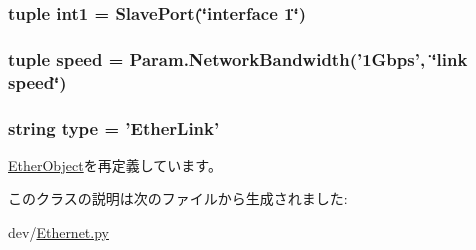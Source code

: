 \label{classEthernet_1_1EtherLink_a104730226138d5db620428dfce066f24}
\hypertarget{classEthernet_1_1EtherLink_ad5ae494ae031467268ae9a0b4260bf12}{
\subsubsection[{int1}]{\setlength{\rightskip}{0pt plus 5cm}tuple {\bf int1} = {\bf SlavePort}(\char`\"{}interface 1\char`\"{})}}
\label{classEthernet_1_1EtherLink_ad5ae494ae031467268ae9a0b4260bf12}
\hypertarget{classEthernet_1_1EtherLink_a33da1950995c2bf1208262efeb4de233}{
\subsubsection[{speed}]{\setlength{\rightskip}{0pt plus 5cm}tuple {\bf speed} = Param.NetworkBandwidth('1Gbps', \char`\"{}link speed\char`\"{})}}
\label{classEthernet_1_1EtherLink_a33da1950995c2bf1208262efeb4de233}
\hypertarget{classEthernet_1_1EtherLink_acce15679d830831b0bbe8ebc2a60b2ca}{
\subsubsection[{type}]{\setlength{\rightskip}{0pt plus 5cm}string {\bf type} = '{\bf EtherLink}'}}
\label{classEthernet_1_1EtherLink_acce15679d830831b0bbe8ebc2a60b2ca}


\hyperlink{classEthernet_1_1EtherObject_acce15679d830831b0bbe8ebc2a60b2ca}{EtherObject}を再定義しています。

このクラスの説明は次のファイルから生成されました:\begin{DoxyCompactItemize}
\item 
dev/\hyperlink{Ethernet_8py}{Ethernet.py}\end{DoxyCompactItemize}

